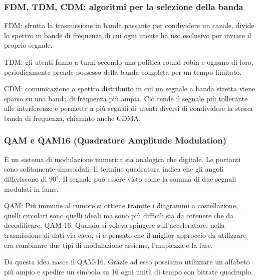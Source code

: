 \subsubsection{FDM, TDM, CDM: algoritmi per la selezione della banda}

FDM: sfrutta la trasmissione in banda passante per condividere un canale, divide lo spettro in
bande di frequenza di cui ogni utente ha uso esclusivo per inviare il proprio segnale.

TDM: gli utenti fanno a turni secondo una politica round-robin e ognuno di loro, periodicamente
prende possesso della banda completa per un tempo limitato.

CDM: comunicazione a spettro distribuito in cui un segnale a banda stretta viene sparso su una
banda di frequenza più ampia. Ciò rende il segnale più tollerante alle interferenze e permette a più
segnali di utenti diversi di condividere la stessa banda di frequenza, chiamato anche CDMA.

\subsubsection{QAM e QAM16 (Quadrature Amplitude Modulation)}

È un sistema di modulazione numerica sia analogica che digitale. Le portanti sono solitamente
sinusoidali. Il termine quadratura indica che gli angoli differiscono di $90 ^{\circ}$. Il segnale può essere visto
come la somma di due segnali modulati in fame.

QAM: Più immune al rumore si ottiene tramite i diagrammi a costellazione, quelli circolari sono
quelli ideali ma sono più difficili sia da ottenere che da decodificare.
QAM 16: Quando si voleva spingere sull’acceleratore, nella trasmissione di dati via cavo, si è
pensato che il miglior approccio da utilizzare era combinare due tipi di modulazione assieme,
l’ampiezza e la fase.

Da questa idea nasce il QAM-16. Grazie ad esso possiamo utilizzare un alfabeto più ampio e spedire
un simbolo su 16 ogni unità di tempo con bitrate quadruplo.